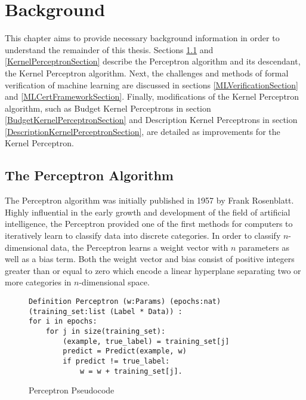 \chapter{Background}\label{BackgroundChapter}
This chapter aims to provide necessary background information in order to understand the remainder of this thesis. Sections \ref{PerceptronSection} and \ref{KernelPerceptronSection} describe the Perceptron algorithm and its descendant, the Kernel Perceptron algorithm. Next, the challenges and methods of formal verification of machine learning are discussed in sections \ref{MLVerificationSection} and \ref{MLCertFrameworkSection}. Finally, modifications of the Kernel Perceptron algorithm, such as Budget Kernel Perceptrons in section \ref{BudgetKernelPerceptronSection} and Description Kernel Perceptrons in section \ref{DescriptionKernelPerceptronSection}, are detailed as improvements for the Kernel Perceptron.
\section{The Perceptron Algorithm}\label{PerceptronSection}
The Perceptron algorithm was initially published in 1957 by Frank Rosenblatt. Highly influential in the early growth and development of the field of artificial intelligence, the Perceptron \cite{Ros57} provided one of the first methods for computers to iteratively learn to classify data into discrete categories. In order to classify $n$-dimensional data, the Perceptron learns a weight vector with $n$ parameters as well as a bias term. Both the weight vector and bias consist of positive integers greater than or equal to zero which encode a linear hyperplane separating two or more categories in $n$-dimensional space.

\begin{figure}
    \caption{Perceptron Pseudocode}
    \label{PerceptronPseudo}
    \begin{lstlisting}
Definition Perceptron (w:Params) (epochs:nat) (training_set:list (Label * Data)) :
for i in epochs:
    for j in size(training_set):
        (example, true_label) = training_set[j]
        predict = Predict(example, w)
        if predict != true_label:
            w = w + training_set[j].
    \end{lstlisting}
\end{figure}

